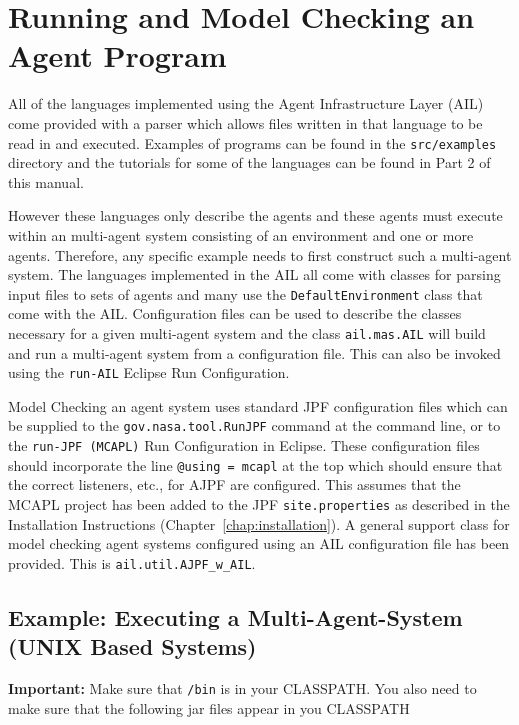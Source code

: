\chapter{Running and Model Checking an Agent Program}
\label{chap:running}

All of the languages implemented using the Agent Infrastructure Layer (AIL) come provided with a parser which allows files written in that language to be read in and executed.  Examples of programs can be found in the \texttt{src/examples} directory and the tutorials for some of the languages can be found in Part 2 of this manual.

However these languages only describe the agents and these agents must execute within an multi-agent system consisting of an environment and one or more agents.  Therefore, any specific example needs to first construct such a multi-agent system.  The languages implemented in the AIL all come with classes for parsing input files to sets of agents and many use the \texttt{DefaultEnvironment} class that come with the AIL. Configuration files can be used to describe the classes necessary  for a given multi-agent system and the class \texttt{ail.mas.AIL} will build and run a multi-agent system from a configuration file.  This can also be invoked using the \texttt{run-AIL} Eclipse Run Configuration.

Model Checking an agent system uses standard JPF configuration files which can be supplied to the \texttt{gov.nasa.tool.RunJPF} command at the command line, or to the \texttt{run-JPF (MCAPL)} Run Configuration in Eclipse.  These configuration files should incorporate the line \texttt{@using = mcapl} at the top which should ensure that the correct listeners, etc., for AJPF are configured.  This assumes that the MCAPL project has been added to the JPF \texttt{site.properties} as described in the Installation Instructions (Chapter~\ref{chap:installation}).  A general support class for model checking agent systems configured using an AIL configuration file has been provided.  This is \texttt{ail.util.AJPF\_w\_AIL}. 

\section{Example: Executing a Multi-Agent-System (UNIX Based Systems)}
{\bf Important:} Make sure that \texttt{\ajpfversion/bin} is in your CLASSPATH.  You also need to make sure that the following jar files appear in you CLASSPATH

